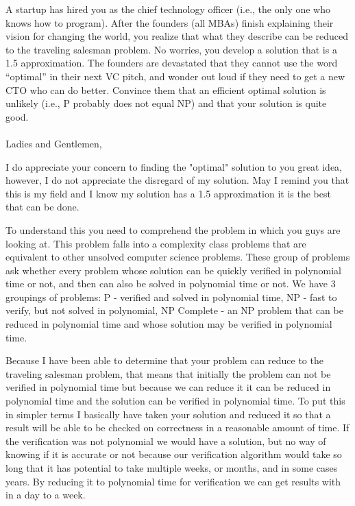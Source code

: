 \documentclass[12pt]{article}
\begin{document}
\renewcommand{\headrulewidth}{0.5pt}

\phantom{Test}
A startup has hired you as the chief technology officer (i.e., the only one who
knows how to program). After the founders (all MBAs) finish explaining their
vision for changing the world, you realize that what they describe can be
reduced to the traveling salesman problem. No worries, you develop a solution
that is a 1.5 approximation. The founders are devastated that they cannot use
the word ``optimal'' in their next VC pitch, and wonder out loud if they need
to get a new CTO who can do better. Convince them that an efficient optimal
solution is unlikely (i.e., P probably does not equal NP) and that your
solution is quite good.
\\
\\
Ladies and Gentlemen,

I do appreciate your concern to finding the "optimal" solution to you great idea, however, I do not appreciate the disregard of my solution. May I remind you that this is my field and I know my solution has a 1.5 approximation it is the best that can be done. 

To understand this you need to comprehend the problem in which you guys are looking at. This problem falls into a complexity class problems that are equivalent to other unsolved computer science problems. These group of problems ask whether every problem whose solution can be quickly verified in polynomial time or not, and then can also be solved in polynomial time or not. We have 3 groupings of problems: P - verified and solved in polynomial time, NP - fast to verify, but not solved in polynomial, NP Complete - an NP problem that can be reduced in polynomial time and whose solution may be verified in polynomial time. 

Because I have been able to determine that your problem can reduce to the traveling salesman problem, that means that initially the problem can not be verified in polynomial time but because we can reduce it it can be reduced in polynomial time and the solution can be verified in polynomial time. To put this in simpler terms I basically have taken your solution and reduced it so that a result will be able to be checked on correctness in a reasonable amount of time. If the verification was not polynomial we would have a solution, but no way of knowing if it is accurate or not because our verification algorithm would take so long that it has potential to take multiple weeks, or months, and in some cases years. By reducing it to polynomial time for verification we can get results with in a day to a week. 
\end{document}
